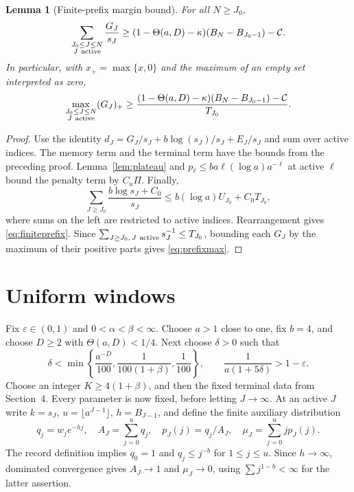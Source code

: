 \documentclass[11pt]{article}
\newtheorem{lemma}[theorem]{Lemma}
\theoremstyle{remark}\newtheorem{remark}[theorem]{Remark}
\begin{document}
\begin{lemma}[Finite-prefix margin bound]\label{lem:prefix}
For all $N\ge J_0$,
\begin{equation}\label{eq:finiteprefix}
 \sum_{\substack{J_0\le J\le N\\J\ {\rm active}}}\frac{G_J}{s_J}
 \ge(1-\Theta(a,D)-\kappa)(B_N-B_{J_0-1})-\mathcal C.
\end{equation}
In particular, with $x_+=\max\{x,0\}$ and the maximum of an empty set
interpreted as zero,
\begin{equation}\label{eq:prefixmax}
 \max_{\substack{J_0\le J\le N\\J\ {\rm active}}}(G_J)_+
 \ge\frac{(1-\Theta(a,D)-\kappa)(B_N-B_{J_0-1})-\mathcal C}{T_{J_0}}.
\end{equation}
\end{lemma}

\begin{proof}
Use the identity
$d_J=G_J/s_J+b\log(s_J)/s_J+E_J/s_J$ and sum over active indices.
The memory term and the terminal term have the bounds from the preceding
proof. Lemma~\ref{lem:plateau} and
$p_\ell\le ba\ell(\log a)a^{-\ell}$ at active $\ell$ bound the penalty
term by $C_a\Pi$. Finally,
\[
 \sum_{J\ge J_0}\frac{b\log s_J+C_0}{s_J}
 \le b(\log a)U_{J_0}+C_0T_{J_0},
\]
where sums on the left are restricted to active indices. Rearrangement
gives \eqref{eq:finiteprefix}. Since
$\sum_{J\ge J_0,\,J\ {\rm active}}s_J^{-1}\le T_{J_0}$, bounding each
$G_J$ by the maximum of their positive parts gives \eqref{eq:prefixmax}.
\end{proof}

\section{Uniform windows}
Fix $\varepsilon\in(0,1)$ and $0<\alpha<\beta<\infty$. Choose $a>1$ close
to one, fix $b=4$, and choose $D\ge2$ with $\Theta(a,D)<1/4$. Next choose
$\delta>0$ such that
\begin{equation}\label{eq:parameters}
 \delta<\min\left\{\frac{a^{-D}}{100},\frac1{100(1+\beta)},\frac1{100}\right\},
 \qquad \frac1{a(1+5\delta)}>1-\varepsilon.
\end{equation}
Choose an integer $K\ge4(1+\beta)$, and then the fixed terminal data from
Section~4. Every parameter is now fixed, before letting $J\to\infty$.
At an active $J$ write $k=s_J$, $u=\lfloor a^{J-1}\rfloor$, $h=B_{J-1}$,
and define the finite auxiliary distribution
\begin{equation}\label{eq:auxiliary}
 q_j=w_je^{-hj},\quad A_J=\sum_{j=0}^{u}q_j,\quad
 p_J(j)=q_j/A_J,\quad \mu_J=\sum_{j=0}^{u}j p_J(j).
\end{equation}
The record definition implies $q_0=1$ and $q_j\le j^{-b}$ for $1\le j\le u$.
Since $h\to\infty$, dominated convergence gives $A_J\to1$ and $\mu_J\to0$,
using $\sum j^{1-b}<\infty$ for the latter assertion.
\end{document}
